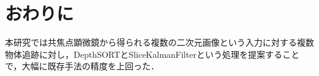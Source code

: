 \section{おわりに}
本研究では共焦点顕微鏡から得られる複数の二次元画像という入力に対する複数物体追跡に対し，DepthSORTとSliceKalmanFilterという処理を提案することで，大幅に既存手法の精度を上回った．